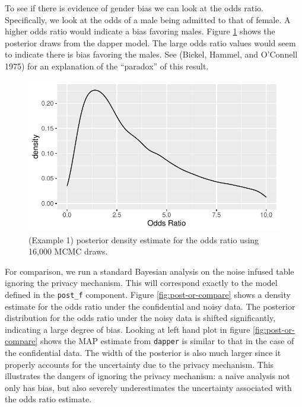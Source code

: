To see if there is evidence of gender bias we can look at the odds ratio.
Specifically, we look at the odds of a male being admitted to
that of female. A higher odds ratio would indicate a bias
favoring males. Figure \ref{fig:post-or-density} shows the posterior draws
from the dapper model. The large odds ratio values would seem
to indicate there is bias favoring the males. See (Bickel, Hammel, and O'Connell 1975) for
an explanation of the ``paradox'' of this result.

\begin{figure}

{\centering \includegraphics{dppaper_files/figure-latex/post-or-density-1} 

}

\caption{(Example 1) posterior density estimate for the odds ratio using 16,000 MCMC draws.}\label{fig:post-or-density}
\end{figure}

For comparison, we run a standard Bayesian analysis on the
noise infused table ignoring the privacy mechanism. This will
correspond exactly to the model defined in the \texttt{post\_f} component.
Figure \ref{fig:post-or-compare} shows a density estimate for the odds ratio
under the confidential and noisy data. The posterior
distribution for the odds ratio under the noisy data
is shifted significantly, indicating a large degree of bias.
Looking at left hand plot in figure \ref{fig:post-or-compare} shows the MAP estimate from \texttt{dapper}
is similar to that in the case of the confidential data.
The width of the posterior is also much larger since
it properly accounts for the uncertainty due to the privacy mechanism. This
illustrates the dangers of ignoring the privacy mechanism: a naive
analysis not only has bias, but also severely underestimates the
uncertainty associated with the odds ratio estimate.

